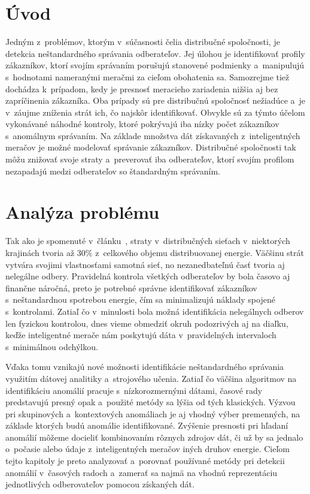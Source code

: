 \documentclass[a4paper,twoside,slovak,12pt]{article}
\begin{document}
\newpage
\setcounter{page}{1}
\section{Úvod}
Jedným z~problémov, ktorým v~súčasnosti čelia distribučné spoločnosti, je
detekcia neštandardného správania odberateľov. Jej úlohou je identifikovať
profily zákazníkov, ktorí svojím správaním porušujú stanovené podmienky
a~manipulujú s~hodnotami nameranými meračmi za cieľom obohatenia sa. Samozrejme
tiež dochádza k~prípadom, kedy je presnosť meracieho zariadenia nižšia aj bez
zapríčinenia zákazníka. Oba prípady sú pre distribučnú spoločnosť nežiadúce a~je
v~záujme zníženia strát ich, čo najskôr identifikovať. Obvykle sú za týmto
účelom vykonávané náhodné kontroly, ktoré pokrývajú iba nízky počet zákazníkov
s~anomálnym správaním. Na základe množstva dát získavaných z~inteligentných
meračov je možné modelovať správanie zákazníkov. Distribučné spoločnosti tak
môžu znižovať svoje straty a~preverovať iba odberateľov, ktorí svojím profilom
nezapadajú medzi odberateľov so štandardným správaním.



\newpage
\section{Analýza problému}
\label{c:problem-analysis}
Tak ako je spomenuté v~článku~\cite{Meffe2009}, straty v~distribučných sieťach
v~niektorých krajinách tvoria až 30\% z~celkového objemu distribuovanej energie.
Väčšinu strát vytvára svojimi vlastnosťami samotná sieť, no nezanedbateľnú časť
tvoria aj nelegálne odbery. Pravidelná kontrola všetkých odberateľov by bola
časovo aj finančne náročná, preto je potrebné správne identifikovať zákazníkov
s~neštandardnou spotrebou energie, čím sa minimalizujú náklady spojené
s~kontrolami. Zatiaľ čo v~minulosti bola možná identifikácia nelegálnych odberov
len fyzickou kontrolou, dnes vieme obmedziť okruh podozrivých aj na diaľku,
keďže inteligentné merače nám poskytujú dáta v~pravidelných intervaloch
s~minimálnou odchýlkou.

Vďaka tomu vznikajú nové možnosti identifikácie neštandardného správania
využitím dátovej analitiky a~strojového učenia. Zatiaľ čo väčšina algoritmov na
identifikáciu anomálií pracuje s~nízkorozmernými dátami, časové rady predstavujú
presný opak a~použité metódy sa lýšia od tých klasických. Výzvou pri skupinových
a~kontextových anomáliach je aj vhodný výber premenných, na základe ktorých budú
anomálie identifikované. Zvýšenie presnosti pri hľadaní anomálií môžeme docieliť
kombinovaním rôznych zdrojov dát, či už by sa jednalo o~počasie alebo údaje
z~inteligentných meračov iných druhov energie. Cieľom tejto kapitoly je preto
analyzovať a~porovnať používané metódy pri detekcii anomálií v~časových radoch
a~zamerať sa najmä na vhodnú reprezentáciu jednotlivých odberovateľov pomocou
získaných dát.
\end{document}
